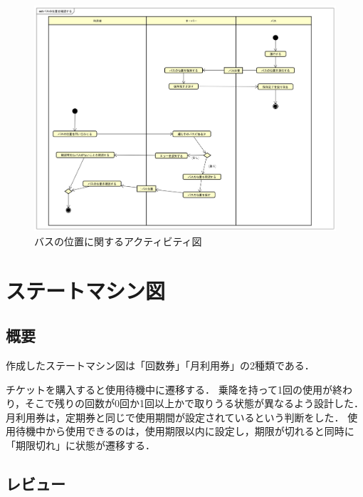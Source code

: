 \documentclass[documentclass]{jsarticle}
\begin{document}
\begin{figure}[H]
  \begin{center}
    \includegraphics*[scale=0.4]{figure/7-1.png}
  \end{center}
  \caption{バスの位置に関するアクティビティ図}
  \label{fig:7-1}
\end{figure}

\newpage

\section{ステートマシン図}
\subsection*{概要}
作成したステートマシン図は「回数券」「月利用券」の2種類である．

チケットを購入すると使用待機中に遷移する．
乗降を持って1回の使用が終わり，そこで残りの回数が0回か1回以上かで取りうる状態が異なるよう設計した．
月利用券は，定期券と同じで使用期間が設定されているという判断をした．
使用待機中から使用できるのは，使用期限以内に設定し，期限が切れると同時に「期限切れ」に状態が遷移する．

\subsection*{レビュー}
\end{document}
